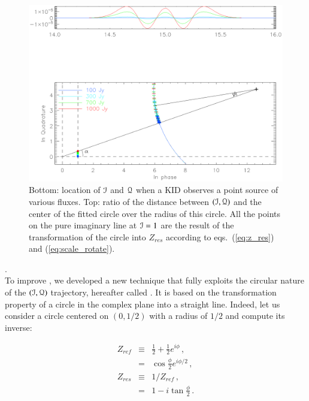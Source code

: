 \subsubsection{\methodd}

\begin{figure}
\includegraphics[clip, angle=0, width=\columnwidth]{Figures/circle_zres.eps}
\caption{Bottom: location of $\mathcal{I}$ and $\mathcal{Q}$ when a KID observes a point source of
  various fluxes. Top: ratio of the distance between $(\mathcal{I},\mathcal{Q})$ and the center of
  the fitted circle over the radius of this circle. All the points on the pure
  imaginary line at $\mathcal{I}=1$ are the result of the transformation of the circle
  into $Z_{res}$ according to eqs.~(\ref{eq:z_res}) and
  (\ref{eq:scale_rotate}).}
\label{fig:circle_zres}
\end{figure}

.\\

To improve \methodu, we developed a new technique that fully exploits the circular
nature of the $(\mathcal{I},\mathcal{Q})$ trajectory, hereafter called \methodd. It is
  based on the transformation property of a circle in the complex plane into a
  straight line. Indeed, let us consider a circle centered on $(0,1/2)$ with a
  radius of $1/2$ and compute its inverse:

\begin{eqnarray}
Z_{ref} &\equiv&\frac{1}{2} + \frac{1}{2}e^{i\phi}\,, \\
&=&\cos\frac{\phi}{2}e^{i\phi/2}\,,\\
Z_{res} &\equiv& 1/Z_{ref}\,, \label{eq:z_res} \\
&=&1-i\tan\frac{\phi}{2}\,.
\label{eq:z_res}
\end{eqnarray}

